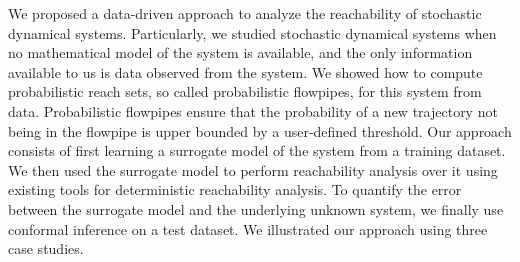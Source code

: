 We proposed a data-driven approach to analyze the reachability of stochastic dynamical systems. Particularly, we studied stochastic dynamical systems when no mathematical model of the system is available, and the only information available to us is data observed from the system. We showed how to compute probabilistic reach sets, so called probabilistic flowpipes, for this system from data. Probabilistic flowpipes ensure that the probability of a new trajectory not being in the flowpipe is upper bounded by a user-defined threshold. Our approach consists of first learning a surrogate model of the system from a training dataset. We then used the surrogate model to perform reachability analysis over it using existing tools for deterministic reachability analysis. To quantify the error between the surrogate model and the underlying unknown system, we finally use conformal inference on a test dataset. We illustrated our approach using three case studies.